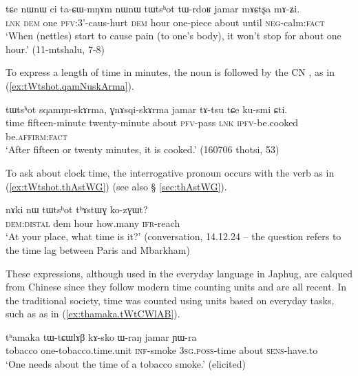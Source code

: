  \begin{exe}
\ex \label{ex:tWtshot.tWrdoR}
 \gll  tɕe nɯnɯ ci ta-ɕɯ-mŋɤm nɯnɯ tɯtsʰot tɯ-rdoʁ jamar mɤɕtʂa mɤ-ʑi. \\
 \textsc{lnk} \textsc{dem} one \textsc{pfv}:3'-caus-hurt \textsc{dem} hour one-piece about until \textsc{neg}-calm:\textsc{fact} \\
 \glt `When (nettles) start to cause pain (to one's body), it won't stop for about one hour.' (11-mtshalu, 7-8)
  \end{exe}

To express a length of time in minutes, the noun    is followed by the CN , as in (\ref{ex:tWtshot.qamNuskArma}).
  
 \begin{exe}
\ex \label{ex:tWtshot.qamNuskArma}
 \gll  tɯtsʰot sqamŋu-skɤrma, ɣnɤsqi-skɤrma jamar tɤ-tsu tɕe ku-smi ɕti. \\
 time fifteen-minute twenty-minute about \textsc{pfv}-pass \textsc{lnk} \textsc{ipfv}-be.cooked be.\textsc{affirm}:\textsc{fact} \\
 \glt `After fifteen or twenty minutes, it is cooked.' (160706 thotsi, 53)
   \end{exe}

To ask about clock time, the interrogative pronoun  occurs with the verb  as in (\ref{ex:tWtshot.thAstWG}) (see also § \ref{sec:thAstWG}).

  \begin{exe}
\ex \label{ex:tWtshot.thAstWG}
 \gll     nɤki nɯ tɯtsʰot tʰɤstɯɣ ko-zɣɯt? \\
 \textsc{dem}:\textsc{distal} dem hour how.many \textsc{ifr}-reach \\
 \glt  `At your place, what time is it?' (conversation, 14.12.24 -- the question refers to the time lag between Paris and Mbarkham)
    \end{exe}
    
 These expressions, although used in the everyday language in Japhug, are calqued from Chinese since they follow modern time counting units and are all recent. In the traditional society, time was counted using units based on everyday tasks, such as  as in  (\ref{ex:thamaka.tWtCWlAB}).
 
   \begin{exe}
\ex \label{ex:thamaka.tWtCWlAB}
 \gll    tʰamaka tɯ-tɕɯlɤβ kɤ-sko ɯ-raŋ jamar ɲɯ-ra \\
tobacco  one-tobacco.time.unit \textsc{inf}-smoke \textsc{3sg}.\textsc{poss}-time about \textsc{sens}-have.to \\
\glt `One needs about the time of a tobacco smoke.' (elicited)
 \end{exe}
    
